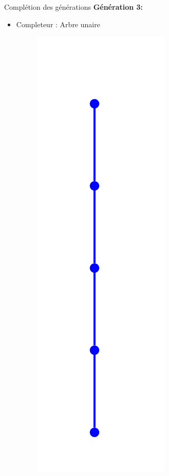 \documentclass{beamer}
\begin{document}
\begin{frame}{Complétion des générations}
\textbf{Génération 3:}\\
\begin{itemize}
\item  Completeur : Arbre unaire
\begin{figure}[h]
  \centering
  \includegraphics[scale=0.17]{gen3-1.png}
\end{figure}
\end{itemize}
\end{frame}
\end{document}

